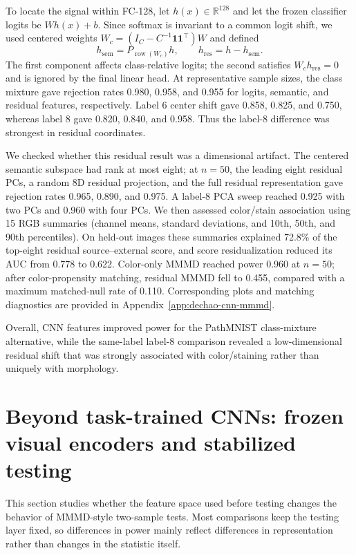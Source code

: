 \documentclass[12pt]{article}
\begin{document}
To locate the signal within FC-128, let $h(x)\in\mathbb{R}^{128}$ and let the frozen classifier logits be $Wh(x)+b$. Since softmax is invariant to a common logit shift, we used centered weights $W_c=(I_C-C^{-1}\mathbf 1\mathbf 1^\top)W$ and defined
\[
h_{\mathrm{sem}}=P_{\operatorname{row}(W_c)}h,
\qquad
h_{\mathrm{res}}=h-h_{\mathrm{sem}}.
\]
The first component affects class-relative logits; the second satisfies $W_ch_{\mathrm{res}}=0$ and is ignored by the final linear head. At representative sample sizes, the class mixture gave rejection rates 0.980, 0.958, and 0.955 for logits, semantic, and residual features, respectively. Label 6 center shift gave 0.858, 0.825, and 0.750, whereas label 8 gave 0.820, 0.840, and 0.958. Thus the label-8 difference was strongest in residual coordinates.

We checked whether this residual result was a dimensional artifact. The centered semantic subspace had rank at most eight; at $n=50$, the leading eight residual PCs, a random 8D residual projection, and the full residual representation gave rejection rates 0.965, 0.890, and 0.975. A label-8 PCA sweep reached 0.925 with two PCs and 0.960 with four PCs. We then assessed color/stain association using 15 RGB summaries (channel means, standard deviations, and 10th, 50th, and 90th percentiles). On held-out images these summaries explained 72.8\% of the top-eight residual source--external score, and score residualization reduced its AUC from 0.778 to 0.622. Color-only MMMD reached power 0.960 at $n=50$; after color-propensity matching, residual MMMD fell to 0.455, compared with a maximum matched-null rate of 0.110. Corresponding plots and matching diagnostics are provided in Appendix~\ref{app:dechao-cnn-mmmd}.

Overall, CNN features improved power for the PathMNIST class-mixture alternative, while the same-label label-8 comparison revealed a low-dimensional residual shift that was strongly associated with color/staining rather than uniquely with morphology.

\endgroup

\section{Beyond task-trained CNNs: frozen visual encoders and stabilized testing}

This section studies whether the feature space used before testing changes the behavior of MMMD-style two-sample tests. Most comparisons keep the testing layer fixed, so differences in power mainly reflect differences in representation rather than changes in the statistic itself.
\end{document}
